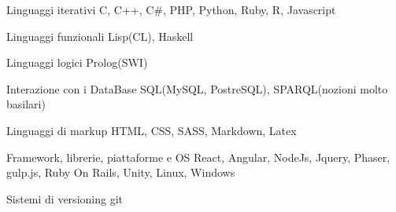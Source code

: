 

\begin{cvskills}

  \cvskill
    {Linguaggi iterativi} %
    {C, C++, C\#, PHP, Python, Ruby, R, Javascript}

  \cvskill
    {Linguaggi funzionali} %
    {Lisp(CL), Haskell} %

  \cvskill
    {Linguaggi logici} %
    {Prolog(SWI)} %

  \cvskill
    {Interazione con i DataBase} %
    {SQL(MySQL, PostreSQL), SPARQL(nozioni molto basilari)} %

  \cvskill
    {Linguaggi di markup} %
    {HTML, CSS, SASS, Markdown, Latex} %

  \cvskill
    {Framework, librerie, piattaforme e OS} %
    {React, Angular, NodeJs, Jquery, Phaser, gulp.js, Ruby On Rails, Unity,
     Linux, Windows} %

  \cvskill
    {Sistemi di versioning} %
    {git} %

\end{cvskills}
